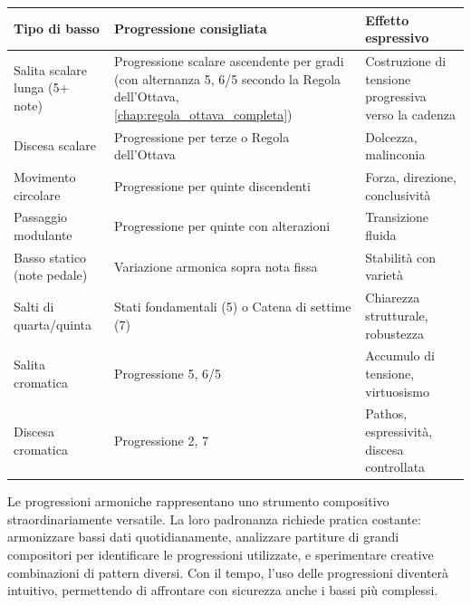 \begin{regola}
	\label{reg:scelta_progressioni}
	
	\begin{tabular}{|p{4.5cm}|p{4.5cm}|p{4.5cm}|}
		\hline
		\textbf{Tipo di basso} & \textbf{Progressione consigliata} & \textbf{Effetto espressivo} \\
		\hline
		Salita scalare lunga (5+ note) & Progressione scalare ascendente per gradi (con alternanza 5, 6/5 secondo la Regola dell'Ottava, \ref{chap:regola_ottava_completa}) \footnotemark & Costruzione di tensione progressiva verso la cadenza \\
		\hline

		Discesa scalare & Progressione per terze o Regola dell'Ottava & Dolcezza, malinconia \\
		\hline
		Movimento circolare & Progressione per quinte discendenti & Forza, direzione, conclusività \\
		\hline
		Passaggio modulante & Progressione per quinte con alterazioni & Transizione fluida \\
		\hline
		Basso statico (note pedale) & Variazione armonica sopra nota fissa & Stabilità con varietà \\
		\hline
		Salti di quarta/quinta & Stati fondamentali (5) o Catena di settime (7) & Chiarezza strutturale, robustezza \\
		\hline
		Salita cromatica & Progressione 5, 6/5 & Accumulo di tensione, virtuosismo \\
		\hline
		Discesa cromatica & Progressione 2, 7 & Pathos, espressività, discesa controllata \\
		\hline
	\end{tabular}
\end{regola}

\vspace{1cm}

Le progressioni armoniche rappresentano uno strumento compositivo straordinariamente versatile. La loro padronanza richiede pratica costante: armonizzare bassi dati quotidianamente, analizzare partiture di grandi compositori per identificare le progressioni utilizzate, e sperimentare creative combinazioni di pattern diversi. Con il tempo, l'uso delle progressioni diventerà intuitivo, permettendo di affrontare con sicurezza anche i bassi più complessi.

